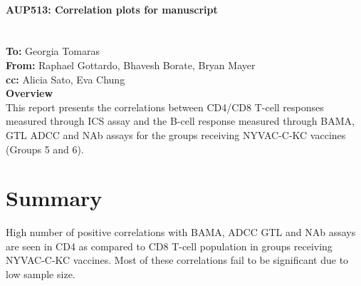 \documentclass[11pt]{article}\usepackage[]{graphicx}\usepackage[]{color}
\renewcommand{\headrulewidth}{0.0pt}
\renewcommand{\footrulewidth}{0.0pt}}
\renewcommand{\headrulewidth}{0.4pt}
\renewcommand{\footrulewidth}{0.4pt}
\renewcommand{\headrulewidth}{0.8pt}
\renewcommand{\footrulewidth}{0.8pt}
\begin{document}
\newcommand{\tab}{\hspace*{2cm}} %
\newcommand{\bat}{\vspace*{2pc}} %
\textnormal {\normalfont}
\makeatletter
\let\insertdate\@date
\makeatother

\bat
\Large \textbf{\\ AUP513: Correlation plots for manuscript} \\
\large
\insertdate \\ \\
\textbf{To:} Georgia Tomaras \\
\textbf{From:} Raphael Gottardo, Bhavesh Borate, Bryan Mayer \\
\textbf{cc:} Alicia Sato, Eva Chung \\

\normalsize
\textbf{Overview} \\
This report presents the correlations between CD4/CD8 T-cell responses measured through ICS assay and the B-cell response measured through BAMA, GTL ADCC and NAb assays for the groups receiving NYVAC-C-KC vaccines (Groups 5 and 6). 

\listoffigures


\newpage
\makeatletter
\patchcmd{\@fancyhead}{\rlap}{\color{gray}\rlap}{}{}
\patchcmd{\headrule}{\hrule}{\color{gray}\hrule}{}{}
\patchcmd{\@fancyfoot}{\rlap}{\color{gray}\rlap}{}{}
\patchcmd{\footrule}{\hrule}{\color{gray}\hrule}{}{}
\makeatother
\newpage
{}
\renewcommand{\headrulewidth}{0.4pt}
\renewcommand{\footrulewidth}{0.4pt}
\fancyhead[L]{}



\newpage
\pagestyle{regularpage}
\section{Summary}
High number of positive correlations with BAMA, ADCC GTL and NAb assays are seen in CD4 as compared to CD8 T-cell population in groups receiving NYVAC-C-KC vaccines. Most of these correlations fail to be significant due to low sample size. 
\end{document}
